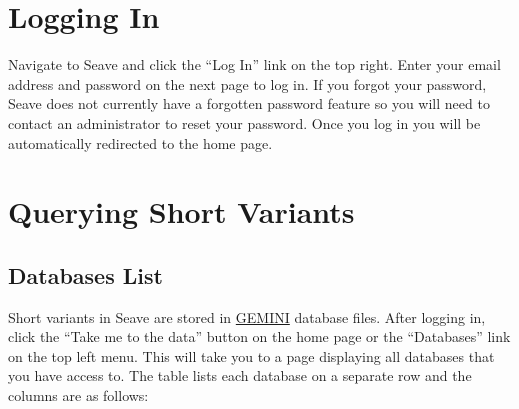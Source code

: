 \documentclass[11pt, a4paper]{article}
\newcommand{\GEMINI}{\href{https://gemini.readthedocs.io}{GEMINI} } %
\begin{document}
\section{Logging In}

Navigate to Seave and click the ``Log In'' link on the top right. Enter your email address and password on the next page to log in. If you forgot your password, Seave does not currently have a forgotten password feature so you will need to contact an administrator to reset your password. Once you log in you will be automatically redirected to the home page.


\section{Querying Short Variants}

\subsection{Databases List}\label{databasesList}

Short variants in Seave are stored in \GEMINI database files. After logging in, click the ``Take me to the data'' button on the home page or the ``Databases'' link on the top left menu. This will take you to a page displaying all databases that you have access to. The table lists each database on a separate row and the columns are as follows:
\end{document}
